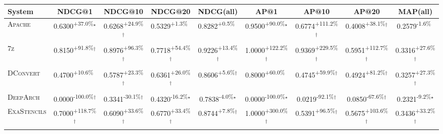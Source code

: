 \begin{table}[htbp]
\centering
\renewcommand{\arraystretch}{1.2}
\begin{tabular}{l|cccc|cccc}
\hline
System & NDCG@1 & NDCG@10 & NDCG@20 & NDCG(all) & AP@1 & AP@10 & AP@20 & MAP(all) \\ \hline
\textsc{Apache} & \cellcolor{green!30}0.6300\textsuperscript{+37.0\%}$^\star$ & \cellcolor{green!30}0.6268\textsuperscript{+24.9\%}$^\dagger$ & \cellcolor{green!30}0.5329\textsuperscript{+1.3\%}$^{\,\,\,}$ & \cellcolor{green!30}0.8282\textsuperscript{+0.5\%}$^{\,\,\,}$ & \cellcolor{green!30}0.9500\textsuperscript{+90.0\%}$^\star$ & \cellcolor{green!30}0.6774\textsuperscript{+111.2\%}$^\dagger$ & \cellcolor{green!30}0.4008\textsuperscript{+38.1\%}$^\dagger$ & \cellcolor{red!30}0.2579\textsuperscript{-1.6\%}$^{\,\,\,}$ \\
\textsc{7z} & \cellcolor{green!30}0.8150\textsuperscript{+91.8\%}$^\dagger$ & \cellcolor{green!30}0.8976\textsuperscript{+96.3\%}$^\dagger$ & \cellcolor{green!30}0.7718\textsuperscript{+54.4\%}$^\dagger$ & \cellcolor{green!30}0.9226\textsuperscript{+13.4\%}$^\dagger$ & \cellcolor{green!30}1.0000\textsuperscript{+122.2\%}$^\dagger$ & \cellcolor{green!30}0.9369\textsuperscript{+229.5\%}$^\dagger$ & \cellcolor{green!30}0.5951\textsuperscript{+112.7\%}$^\dagger$ & \cellcolor{green!30}0.3316\textsuperscript{+27.6\%}$^\dagger$ \\
\textsc{DConvert} & \cellcolor{green!30}0.4700\textsuperscript{+10.6\%}$^{\,\,\,}$ & \cellcolor{green!30}0.5787\textsuperscript{+23.3\%}$^\dagger$ & \cellcolor{green!30}0.6361\textsuperscript{+26.0\%}$^\dagger$ & \cellcolor{green!30}0.8606\textsuperscript{+5.6\%}$^\dagger$ & \cellcolor{green!30}0.8000\textsuperscript{+60.0\%}$^{\,\,\,}$ & \cellcolor{green!30}0.4745\textsuperscript{+59.9\%}$^\dagger$ & \cellcolor{green!30}0.4924\textsuperscript{+81.2\%}$^\dagger$ & \cellcolor{green!30}0.3257\textsuperscript{+27.3\%}$^\dagger$ \\
\textsc{DeepArch} & \cellcolor{red!30}0.0000\textsuperscript{-100.0\%}$^\dagger$ & \cellcolor{red!30}0.3341\textsuperscript{-30.1\%}$^\dagger$ & \cellcolor{red!30}0.4320\textsuperscript{-16.2\%}$^\star$ & \cellcolor{red!30}0.7838\textsuperscript{-4.0\%}$^\star$ & \cellcolor{red!30}0.0000\textsuperscript{-100.0\%}$^\star$ & \cellcolor{red!30}0.0219\textsuperscript{-92.1\%}$^\dagger$ & \cellcolor{red!30}0.0850\textsuperscript{-67.6\%}$^\dagger$ & \cellcolor{red!30}0.2321\textsuperscript{-9.2\%}$^\star$ \\
\textsc{ExaStencils} & \cellcolor{green!30}0.7000\textsuperscript{+118.7\%}$^\dagger$ & \cellcolor{green!30}0.6090\textsuperscript{+33.6\%}$^\dagger$ & \cellcolor{green!30}0.6770\textsuperscript{+33.4\%}$^\dagger$ & \cellcolor{green!30}0.8744\textsuperscript{+7.8\%}$^\dagger$ & \cellcolor{green!30}1.0000\textsuperscript{+300.0\%}$^\dagger$ & \cellcolor{green!30}0.5391\textsuperscript{+96.5\%}$^\dagger$ & \cellcolor{green!30}0.5675\textsuperscript{+103.6\%}$^\dagger$ & \cellcolor{green!30}0.3436\textsuperscript{+33.2\%}$^\dagger$ \\

\end{tabular}
\end{table}
